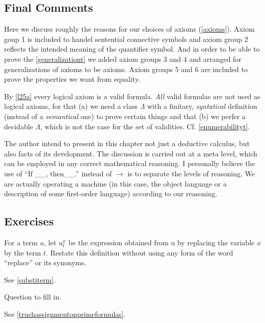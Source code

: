 \subsection*{Final Comments}\label{subsec:final}

Here we discuss roughly the reasons for our choices of axioms (\ref{axioms}). Axiom goup 1 is included to handel sentential connective symbols and axiom group 2 reflects the intended meaning of the quantifier symbol. And in order to be able to prove the \ref{generalizationt} we added axiom groups 3 and 4 and arranged for generalizations of axioms to be axioms. Axiom groups 5 and 6 are included to prove the properties we want from equality.

By \ref{l25a} every logical axiom is a valid formula. \textit{All} valid formulas are not used as logical axioms, for that (a) we need a class $\Lambda$ with a finitary, \textit{syntatical} definition (instead of a \textit{semantical} one) to prove certain things and that (b) we perfer a decidable $\Lambda$, which is not the case for the set of validities. Cf. \ref{enumerabilityt}.

The author intend to present in this chapter not just a deductive calculus, but also facts of its development. The discussion is carried out at a meta level, which can be employed in any correct mathematical reasoning. I personally believe the use of ``If \_\_, then\_\_.'' instead of $\rightarrow$ is to separate the levels of reasoning. We are actually operating a machine (in this case, the object language or a description of some first-order language) according to our reasoning.

\subsection*{Exercises}

\begin{exercise}
  For a term $u$, let $u_t^x$ be the expression obtained from u by replacing the variable $x$ by the term $t$. Restate this definition without using any form of the word “replace” or its synonyms.
\end{exercise}

See \ref{substiterm}.

\setcounter{exercise}{2}

\begin{exercise}
  Question to fill in.
\end{exercise}

See \ref{truchassignmentonprimeformulas}.


